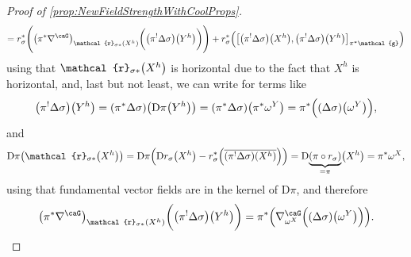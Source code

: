 \documentclass[reqno,a4paper,oneside]{amsart}
\theoremstyle{plain}
\theoremstyle{remark}
\theoremstyle{definition}
\begin{document}
\begin{proof}[Proof of \ref{prop:NewFieldStrengthWithCoolProps}]
\begin{align*}
=
r_\sigma^*\Biggl(
\mleft( \pi^*\nabla^\caG \mright)_{\mathcal{r}_{\sigma*}\mleft(X^h\mright)}\biggl( \mleft(\pi^! \Delta \sigma \mright) \mleft(Y^h\mright)\biggr)
\Biggr)
	+ r_\sigma^*\mleft(
	\mleft[ \mleft(\pi^! \Delta \sigma \mright) \mleft(X^h \mright), \mleft(\pi^! \Delta \sigma \mright)\mleft(Y^h \mright) \mright]_{\mathcal{\pi^*\mathcal{g}}}
\mright)
\end{align*}
using that $\mathcal{r}_{\sigma*}\mleft(X^h\mright)$ is horizontal due to the fact that $X^h$ is horizontal, and, last but not least, we can write for terms like
\begin{equation*}
\mleft(\pi^! \Delta \sigma \mright) \mleft(Y^h\mright)
=
\mleft(\pi^* \Delta \sigma \mright) \mleft(\mathrm{D}\pi\mleft(Y^h\mright)\mright)
=
\mleft(\pi^* \Delta \sigma \mright) \mleft(\pi^*\omega^Y\mright)
=
\pi^*\Bigl( \mleft(\Delta \sigma \mright) \mleft(\omega^Y\mright) \Bigr),
\end{equation*}
and
\begin{equation*}
\mathrm{D}\pi\mleft( \mathcal{r}_{\sigma*}\mleft(X^h\mright) \mright)
=
\mathrm{D}\pi\mleft( \mathrm{D}r_{\sigma}\mleft(X^h\mright)
	- r_{\sigma}^*\mleft({\overline{ \mleft(\pi^! \Delta \sigma \mright) \mleft(X^h\mright)}}\mright) \mright)
=
\mathrm{D}{\underbrace{\mleft( \pi \circ r_\sigma \mright)}_{= \pi}}\mleft(X^h\mright)
=
\pi^*\omega^X,
\end{equation*}
using that fundamental vector fields are in the kernel of $\mathrm{D}\pi$, 
and therefore
\begin{equation*}
\mleft( \pi^*\nabla^\caG \mright)_{\mathcal{r}_{\sigma*}\mleft(X^h\mright)}\biggl( \mleft(\pi^! \Delta \sigma \mright) \mleft(Y^h\mright)\biggr)
=
\pi^*\mleft(
	\nabla^\caG_{\omega^X}\Bigl( \mleft(\Delta \sigma \mright) \mleft(\omega^Y\mright)\Bigr)
\mright).
\end{equation*}


\end{proof}
\end{document}
